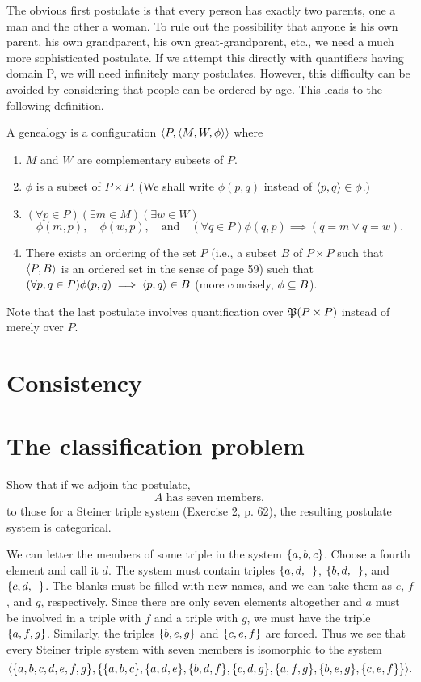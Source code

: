 \begin{solution}
The obvious first postulate is that every person has exactly two parents, one a man
and the other a woman. To rule out the possibility that anyone is his own parent, his own
grandparent, his own great-grandparent, etc., we need a much more sophisticated postulate.
If we attempt this directly with quantifiers having domain P, we will need infinitely
many postulates. However, this difficulty can be avoided by considering that people can
be ordered by age. This leads to the following definition.

A genealogy is a configuration $\left\langle P,\left\langle M, W,\phi\right\rangle\right\rangle$ where
\begin{enumerate}[label=(\roman*)]
    \item $M$ and $W$ are complementary subsets of $P$.
    \item $\phi$ is a subset of $P\times P$. (We shall write $\phi(p,q)$ instead of $\left\langle p,q\right\rangle\in\phi$.)
    \item $(\forall p\in P)(\exists m\in M)(\exists w\in W)$
        \[\phi(m, p),\quad \phi(w,p),\quad\text{and}\quad (\forall q\in P)\phi(q,p)\implies(q=m\lor q=w).\]
    \item There exists an ordering of the set $P$ (i.e., a subset $B$ of $P \times P$ such that $\left\langle P,B\right\rangle$
        is an ordered set in the sense of page 59) such that $(\forall p,q\in P)\phi(p,q)\implies\left\langle p,q\right\rangle\in B$
        (more concisely, $\phi\subseteq B$).
\end{enumerate}
Note that the last postulate involves quantification over $\operatorname{\mathfrak{P}}(P\times P)$ instead of merely
over $P$.
\end{solution}
\section{Consistency}

\section{The classification problem}
\begin{exercise}
Show that if we adjoin the postulate,
\[\text{$A$ has seven members},\]
to those for a Steiner triple system (Exercise 2, p. 62), the resulting postulate system is
categorical.
\end{exercise}

\begin{solution}
We can letter the members of some triple in the system $\left\{a, b, c\right\}$. Choose a fourth
element and call it $d$. The system must contain triples
$\left\{a,d,\enspace\right\}$, $\left\{b,d,\enspace\right\}$, and $\left\{c,d,\enspace\right\}$.
The blanks must be filled with new names, and we can take them as $e$, $f$, and $g$, respectively.
Since there are only seven elements altogether and $a$ must be involved in a triple
with $f$ and a triple with $g$, we must have the triple $\left\{a, f, g\right\}$. Similarly, the triples $\left\{b,e,g\right\}$
and $\left\{c,e,f\right\}$ are forced. Thus we see that every Steiner triple system with seven members
is isomorphic to the system
\[\aprn{\set{a,b,c,d,e,f,g},\set{\set{a,b,c},\set{a,d,e},\set{b,d,f},\set{c,d,g},\set{a,f,g},\set{b,e,g},\set{c,e,f}}}.\]
\end{solution}

